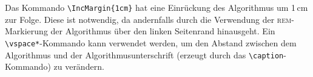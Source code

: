 \setlength{\algomargin}{0mm}



Das Kommando \verb+\IncMargin{1cm}+ hat eine Einr\"uckung des Algorithmus um 1\,cm zur Folge. Diese ist 
notwendig, da andernfalls durch die Verwendung der \textsc{rem}-Markierung der Algorithmus \"uber den 
linken Seitenrand hinausgeht. Ein \verb+\vspace*+-Kommando kann verwendet werden, um den Abstand 
zwischen dem Algorithmus und der Algorithmusunterschrift (erzeugt durch das \verb+\caption+-Kommando) zu ver\"andern.

\clearpage
\begin{algorithmus}[htbp]
\IncMargin{1cm}

\vspace*{-2mm}
\caption{Der Formatierung des Algorithmus 
         IntervalRestriction unter Verwendung von 
         \texttt{\textbackslash{}IncMargin\{1cm\}} 
         und \texttt{\textbackslash{vspace*\{-2mm\}}}
         \label{alg2}}
\end{algorithmus}

